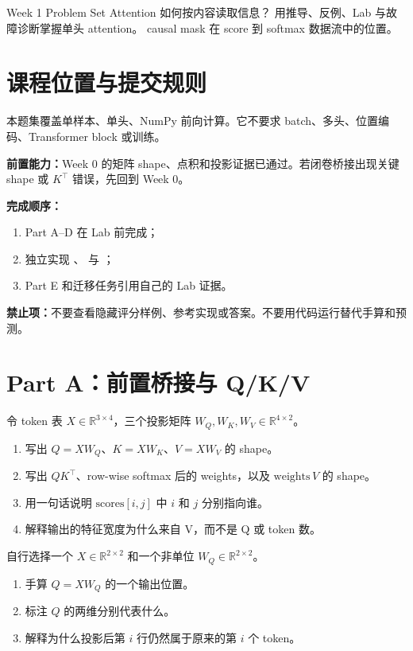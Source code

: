 \documentclass[11pt,a4paper]{article}
\begin{document}
\CourseCover
  {Week 1 Problem Set}
  {Attention 如何按内容读取信息？}
  {用推导、反例、Lab 与故障诊断掌握单头 attention。}
  {causal mask 在 score 到 softmax 数据流中的位置。}

\section{课程位置与提交规则}

本题集覆盖单样本、单头、NumPy 前向计算。它不要求 batch、多头、位置编码、Transformer block 或训练。

\textbf{前置能力：}Week 0 的矩阵 shape、点积和投影证据已通过。若闭卷桥接出现关键 shape 或 $K^\top$ 错误，先回到 Week 0。

\textbf{完成顺序：}
\begin{enumerate}
\item Part A--D 在 Lab 前完成；
\item 独立实现 、 与
      ；
\item Part E 和迁移任务引用自己的 Lab 证据。
\end{enumerate}

\textbf{禁止项：}不要查看隐藏评分样例、参考实现或答案。不要用代码运行替代手算和预测。

\section{Part A：前置桥接与 Q/K/V}

令 token 表 $X\in\mathbb{R}^{3\times4}$，三个投影矩阵
$W_Q,W_K,W_V\in\mathbb{R}^{4\times2}$。
\begin{enumerate}[label=(\arabic*)]
\item 写出 $Q=XW_Q$、$K=XW_K$、$V=XW_V$ 的 shape。
\item 写出 $QK^\top$、row-wise softmax 后的 weights，以及 $\text{weights}\,V$ 的 shape。
\item 用一句话说明 $\text{scores}[i,j]$ 中 $i$ 和 $j$ 分别指向谁。
\item 解释输出的特征宽度为什么来自 V，而不是 Q 或 token 数。
\end{enumerate}
\AnswerSpace{34mm}

自行选择一个 $X\in\mathbb{R}^{2\times2}$ 和一个非单位 $W_Q\in\mathbb{R}^{2\times2}$。
\begin{enumerate}[label=(\arabic*)]
\item 手算 $Q=XW_Q$ 的一个输出位置。
\item 标注 $Q$ 的两维分别代表什么。
\item 解释为什么投影后第 $i$ 行仍然属于原来的第 $i$ 个 token。
\end{enumerate}
\AnswerSpace{28mm}
\end{document}

